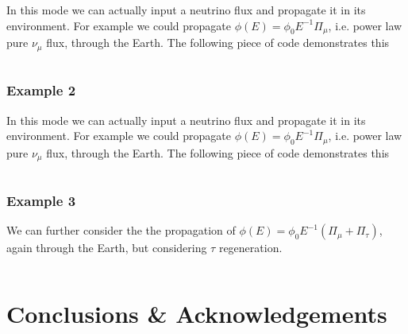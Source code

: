 \documentclass[3p,12pt,authoryear]{elsarticle}
\begin{document}
In this mode we can actually input a neutrino flux and propagate it in its environment. For example we could propagate $\phi(E) = \phi_0 E^{-1} \Pi_\mu$, i.e. power law pure $\nu_\mu$ flux, through the Earth. The following piece of code demonstrates this

\begin{lstlisting}[frame=leftline, numbers = left,breaklines=true]

\end{lstlisting}

\subsubsection{Example 2}

In this mode we can actually input a neutrino flux and propagate it in its environment. For example we could propagate $\phi(E) = \phi_0 E^{-1} \Pi_\mu$, i.e. power law pure $\nu_\mu$ flux, through the Earth. The following piece of code demonstrates this

\begin{lstlisting}[frame=leftline, numbers = left,breaklines=true]

\end{lstlisting}

\subsubsection{Example 3}

We can further consider the the propagation of $\phi(E) = \phi_0 E^{-1} ( \Pi_\mu + \Pi_\tau )$, again through the Earth, but considering $\tau$ regeneration. 

\begin{lstlisting}[frame=leftline, numbers = left,breaklines=true]

\end{lstlisting}

\section{Conclusions \& Acknowledgements} 
\label{sec:conclu} 



\end{document}
